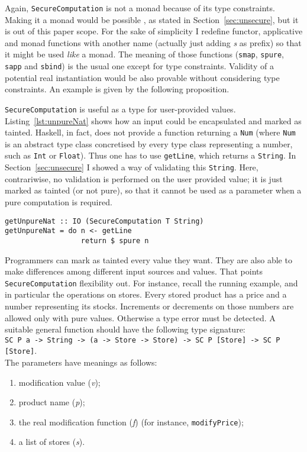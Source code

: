 Again, \texttt{SecureComputation} is not a monad because of its type constraints. Making it a monad would be possible \cite{Sculthorpe:13:ConstrainedMonad}, as stated in Section~\ref{sec:unsecure}, but it is out of this paper scope. For the sake of simplicity I redefine functor, applicative and monad functions with another name (actually just adding \textit{s} as prefix) so that it might be used \textit{like} a monad. The meaning of those functions (\texttt{smap}, \texttt{spure}, \texttt{sapp} and \texttt{sbind}) is the usual one except for type constraints. Validity of a potential real instantiation would be also provable without considering type constraints. An example is given by the following proposition.

\texttt{SecureComputation} is useful as a type for user-provided values. Listing~\ref{lst:unpureNat} shows how an input could be encapsulated and marked as tainted. Haskell, in fact, does not provide a function returning a \texttt{Num} (where \texttt{Num} is an abstract type class concretised by every type class representing a number, such as \texttt{Int} or \texttt{Float}). Thus one has to use \texttt{getLine}, which returns a \texttt{String}. In Section~\ref{sec:unsecure} I showed a way of validating this \texttt{String}. Here, contrariwise, no validation is performed on the user provided value; it is just marked as tainted (or not pure), so that it cannot be used as a parameter when a pure computation is required.
\begin{lstlisting}[caption={Tainted natural number},label={lst:unpureNat}, breaklines=true]
getUnpureNat :: IO (SecureComputation T String)
getUnpureNat = do n <- getLine
                  return $ spure n
\end{lstlisting}
Programmers can mark as tainted every value they want. They are also able to make differences among different input sources and values. That points \texttt{SecureComputation} flexibility out. For instance, recall the running example, and in particular the operations on stores. Every stored product has a price and a number representing its stocks. Increments or decrements on those numbers are allowed only with pure values. Otherwise a type error must be detected. A suitable general function should have the following type signature:\\
\texttt{SC P a -> String -> (a -> Store -> Store) -> SC P [Store] -> SC P [Store]}. \\
The parameters have meanings as follows:
\begin{enumerate}
	\item modification value (\textit{v});
	\item product name (\textit{p});
	\item the real modification function (\textit{f}) (for instance, \texttt{modifyPrice});
	\item a list of stores (\textit{s}).
\end{enumerate}
